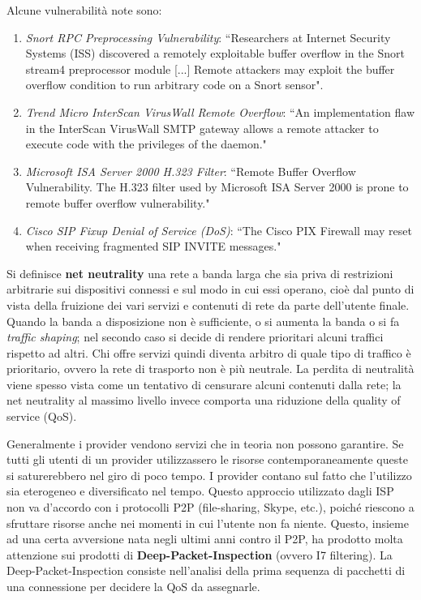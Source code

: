 Alcune vulnerabilità note sono:
\begin{enumerate}
	\item \textit{Snort RPC Preprocessing Vulnerability}: \textquotedblleft Researchers at Internet Security Systems (ISS) discovered a remotely exploitable buffer overflow in the Snort stream4 preprocessor module [...] Remote attackers may exploit the buffer overflow condition to run arbitrary code on a Snort sensor".
	\item \textit{Trend Micro InterScan VirusWall Remote Overflow}: \textquotedblleft An implementation flaw in the InterScan VirusWall SMTP gateway allows a remote attacker to execute code with the privileges of the daemon."
	\item \textit{Microsoft ISA Server 2000 H.323 Filter}: \textquotedblleft Remote Buffer Overflow Vulnerability. The H.323 filter used by Microsoft ISA Server 2000 is prone to remote buffer overflow vulnerability."
	\item \textit{Cisco SIP Fixup Denial of Service (DoS)}: \textquotedblleft The Cisco PIX Firewall may reset when receiving fragmented SIP INVITE messages."
\end{enumerate}

Si definisce \textbf{net neutrality} una rete a banda larga che sia priva di restrizioni arbitrarie sui dispositivi connessi e sul modo in cui essi operano, cioè dal punto di vista della fruizione dei vari servizi e contenuti di rete da parte dell'utente finale. Quando la banda a disposizione non è sufficiente, o si aumenta la banda o si fa \textit{traffic shaping}; nel secondo caso si decide di rendere prioritari alcuni traffici rispetto ad altri. Chi offre servizi quindi diventa arbitro di quale tipo di traffico è prioritario, ovvero la rete di trasporto non è più neutrale. La perdita di neutralità viene spesso vista come un tentativo di censurare alcuni contenuti dalla rete; la net neutrality al massimo livello invece comporta una riduzione della quality of service (QoS).

Generalmente i provider vendono servizi che in teoria non possono garantire. Se tutti gli utenti di un provider utilizzassero le risorse contemporaneamente queste si saturerebbero nel giro di poco tempo. I provider contano sul fatto che l'utilizzo sia eterogeneo e diversificato nel tempo. Questo approccio utilizzato dagli ISP non va d'accordo con i protocolli P2P (file-sharing, Skype, etc.), poiché riescono a sfruttare risorse anche nei momenti in cui l'utente non fa niente. Questo, insieme ad una certa avversione nata negli ultimi anni contro il P2P, ha prodotto molta attenzione sui prodotti di \textbf{Deep-Packet-Inspection} (ovvero I7 filtering). La Deep-Packet-Inspection consiste nell'analisi della prima sequenza di pacchetti di una connessione per decidere la QoS da assegnarle.